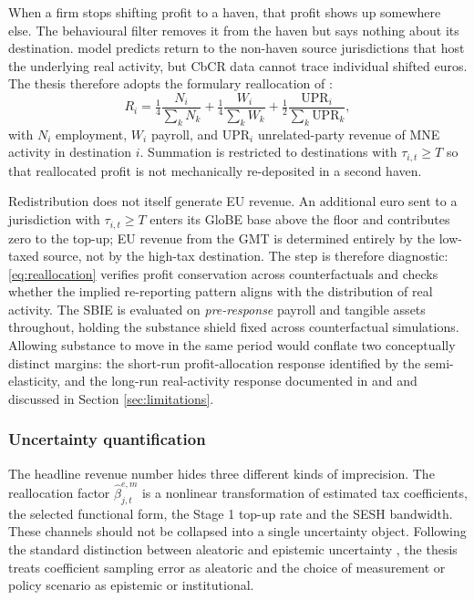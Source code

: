 \documentclass[11pt,a4paper]{article}
\begin{document}
When a firm stops shifting profit to a haven, that profit shows up somewhere else. The behavioural filter removes it from the haven but says nothing about its destination. \citep{johannesen2022} model predicts return to the non-haven source jurisdictions that host the underlying real activity, but CbCR data cannot trace individual shifted euros. The thesis therefore adopts the formulary reallocation of \citet{garcia-bernardo2024}:
\begin{equation}\label{eq:reallocation}
R_i = \tfrac{1}{4}\frac{N_i}{\sum_{k} N_k} + \tfrac{1}{4}\frac{W_i}{\sum_{k} W_k} + \tfrac{1}{2}\frac{\text{UPR}_i}{\sum_{k} \text{UPR}_k},
\end{equation}
with $N_i$ employment, $W_i$ payroll, and $\text{UPR}_i$ unrelated-party revenue of MNE activity in destination $i$. Summation is restricted to destinations with $\tau_{i,t} \geq T$ so that reallocated profit is not mechanically re-deposited in a second haven.

Redistribution does not itself generate EU revenue. An additional euro sent to a jurisdiction with $\tau_{i,t}\ge T$ enters its GloBE base above the floor and contributes zero to the top-up; EU revenue from the GMT is determined entirely by the low-taxed source, not by the high-tax destination. The step is therefore diagnostic: \eqref{eq:reallocation} verifies profit conservation across counterfactuals and checks whether the implied re-reporting pattern aligns with the distribution of real activity. The SBIE is evaluated on \emph{pre-response} payroll and tangible assets throughout, holding the substance shield fixed across counterfactual simulations. Allowing substance to move in the same period would conflate two conceptually distinct margins: the short-run profit-allocation response identified by the semi-elasticity, and the long-run real-activity response documented in \citet{bilicka2022} and \citet{suarezserrato2018} and discussed in Section \ref{sec:limitations}.

\subsubsection{Uncertainty quantification}\label{sec:beta_uncertainty}

The headline revenue number hides three different kinds of imprecision. The reallocation factor $\hat{\beta}_{j,t}^{e,m}$ is a nonlinear transformation of estimated tax coefficients, the selected functional form, the Stage 1 top-up rate and the SESH bandwidth. These channels should not be collapsed into a single uncertainty object. Following the standard distinction between aleatoric and epistemic uncertainty \citep{hullermeier2021}, the thesis treats coefficient sampling error as aleatoric and the choice of measurement or policy scenario as epistemic or institutional.
\end{document}
